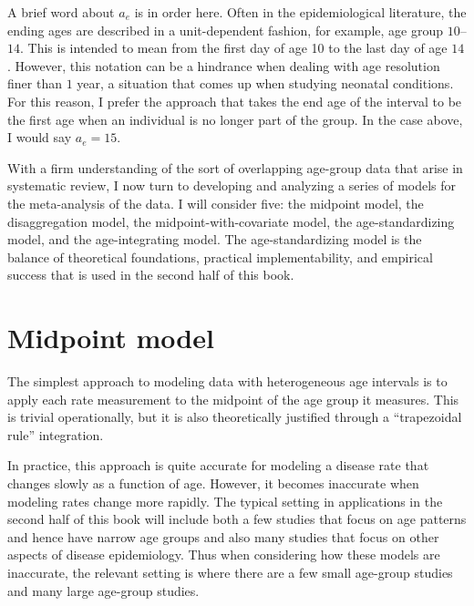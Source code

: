 A brief word about ${a_e}$ is in order here.  Often in the
epidemiological literature, the ending ages are described in a
unit-dependent fashion, for example, age group $10$--$14$.  This is intended
to mean from the first day of age 10 to the last day of age $14$.
However, this notation can be a hindrance when dealing with age
resolution finer than $1$ year, a situation that comes up when studying
neonatal conditions.  For this reason, I prefer the approach that
takes the end age of the interval to be the first age when an
individual is no longer part of the group.  In the case above, I would
say ${a_e} = 15$.


With a firm understanding of the sort of overlapping age-group data
that arise in systematic review, I now turn to developing and
analyzing a series of models for the meta-analysis of the data.
I will consider five: the midpoint model, the disaggregation
model, the midpoint-with-covariate model, the age-standardizing model,
and the age-integrating model.  The age-standardizing model is the
balance of theoretical foundations, practical implementability, and
empirical success that is used in the second half of this
book.

\section{Midpoint model}
\label{theory-age_group_model-mp_model}
The simplest approach to modeling data with heterogeneous age
intervals is to apply each rate measurement to the midpoint of the
age group it measures.  This is trivial operationally, but it is also
theoretically justified through a ``trapezoidal rule'' integration.

In practice, this approach is quite accurate for modeling a
disease rate that changes slowly as a function of age.  However, it
becomes inaccurate when modeling rates change more
rapidly.  The typical setting in applications in the second half of
this book will include both a few studies that focus on age patterns and
hence have narrow age groups and also many studies
that focus on other aspects of disease epidemiology.  Thus when
considering how these models are inaccurate, the relevant setting is where
there are a few small age-group studies and many large age-group
studies.

